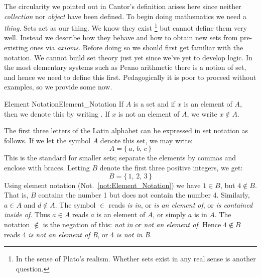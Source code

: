         The circularity we pointed out in Cantor's definition arises here since
        neither \textit{collection} nor \textit{object} have been defined. To
        begin doing mathematics we need a \textit{thing}. Sets act as our thing.
        We know they exist%
        \footnote{%
            In the sense of Plato's realism.%
            Whether sets exist in any real sense is another question.
        }
        but cannot define them very well. Instead we describe how they behave
        and how to obtain new sets from pre-existing ones via \textit{axioms}.
        Before doing so we should first get familiar with the notation. We
        cannot build set theory just yet since we've yet to develop logic. In
        the most elementary systems such as Peano arithmetic there is a notion
        of set, and hence we need to define this first. Pedagogically it is poor
        to proceed without examples, so we provide some now.
        \begin{fnotation}{Element Notation}{Element_Notation}
            If $A$ is a \gls{set} and if $x$ is an element
            of $A$, then we denote this by writing
            . If $x$ is not an element
            of $A$, we write $x\notin{A}$.%
        \end{fnotation}
        \begin{example}
            The first three letters of the Latin alphabet can be expressed in
            set notation as follows. If we let the symbol $A$ denote this set, we
            may write:
            \begin{equation}
                A=\{\,a,\,b,\,c\,\}
            \end{equation}
            This is the standard for smaller sets; separate the elements by
            commas and enclose with braces. Letting $B$ denote the first three
            positive integers, we get:
            \begin{equation}
                B=\{\,1,\,2,\,3\,\}
            \end{equation}
            Using element notation (Not.~\ref{not:Element_Notation}) we have
            $1\in{B}$, but $4\notin{B}$. That is, $B$ contains the number 1 but
            does not contain the number 4. Similarly, $a\in{A}$ and
            $d\notin{A}$. The symbol $\in$ reads \textit{is in}, or
            \textit{is an element of}, or \textit{is contained inside of}. Thus
            $a\in{A}$ reads $a$ is an element of $A$, or simply $a$ is in $A$.
            The notation $\notin$ is the negation of this: \textit{not in} or
            \textit{not an element of}. Hence $4\notin{B}$ reads
            4\textit{ is not an element of B}, or 4\textit{ is not in B}.
        \end{example}
